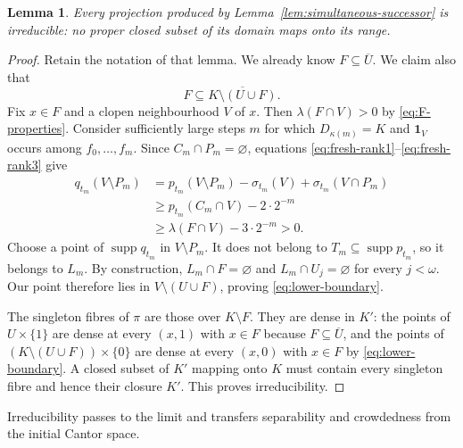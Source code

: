 \documentclass[a4paper,11pt]{amsart}
\theoremstyle{plain}
\newtheorem{lemma}[theorem]{Lemma}
\theoremstyle{definition}
\theoremstyle{remark}
\newcommand{\supp}{\operatorname{supp}}
\newcommand{\one}{\mathbf 1}
\numberwithin{equation}{section}
\begin{document}
\begin{lemma}\label{lem:irreducible-successor}
Every projection produced by Lemma~\ref{lem:simultaneous-successor} is irreducible: no proper closed subset of its domain maps onto its range.
\end{lemma}
\begin{proof}
Retain the notation of that lemma. We already know $F\subseteq\overline U$. We claim also that
\begin{equation}\label{eq:lower-boundary}
F\subseteq\overline{K\setminus(U\cup F)}.
\end{equation}
Fix $x\in F$ and a clopen neighbourhood $V$ of $x$. Then $\lambda(F\cap V)>0$ by \eqref{eq:F-properties}. Consider sufficiently large steps $m$ for which $D_{\kappa(m)}=K$ and $\one_V$ occurs among $f_0,\ldots,f_m$. Since $C_m\cap P_m=\varnothing$, equations \eqref{eq:fresh-rank1}--\eqref{eq:fresh-rank3} give
\begin{align*}
q_{t_m}(V\setminus P_m)
&=p_{t_m}(V\setminus P_m)-\sigma_{t_m}(V)
                                  +\sigma_{t_m}(V\cap P_m)\\
&\geqslant p_{t_m}(C_m\cap V)-2\cdot2^{-m}\\
&\geqslant\lambda(F\cap V)-3\cdot2^{-m}>0.
\end{align*}
Choose a point of $\supp q_{t_m}$ in $V\setminus P_m$. It does not belong to $T_m\subseteq\supp p_{t_m}$, so it belongs to $L_m$. By construction, $L_m\cap F=\varnothing$ and $L_m\cap U_j=\varnothing$ for every $j<\omega$. Our point therefore lies in $V\setminus(U\cup F)$, proving \eqref{eq:lower-boundary}.

The singleton fibres of $\pi$ are those over $K\setminus F$. They are dense in $K'$: the points of $U\times\{1\}$ are dense at every $(x,1)$ with $x\in F$ because $F\subseteq\overline U$, and the points of $(K\setminus(U\cup F))\times\{0\}$ are dense at every $(x,0)$ with $x\in F$ by \eqref{eq:lower-boundary}. A closed subset of $K'$ mapping onto $K$ must contain every singleton fibre and hence their closure $K'$. This proves irreducibility.
\end{proof}

Irreducibility passes to the limit and transfers separability and crowdedness from the initial Cantor space.
\end{document}
